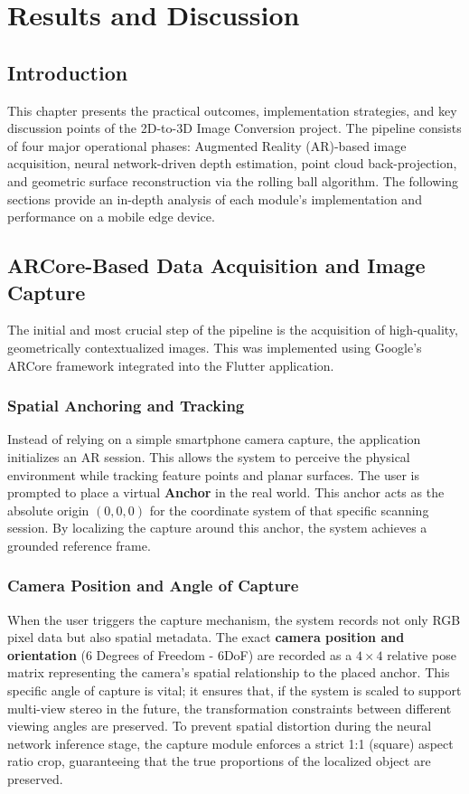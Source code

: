 \chapter{Results and Discussion}

\section{Introduction}
This chapter presents the practical outcomes, implementation strategies, and key discussion points of the 2D-to-3D Image Conversion project. The pipeline consists of four major operational phases: Augmented Reality (AR)-based image acquisition, neural network-driven depth estimation, point cloud back-projection, and geometric surface reconstruction via the rolling ball algorithm. The following sections provide an in-depth analysis of each module's implementation and performance on a mobile edge device.

\section{ARCore-Based Data Acquisition and Image Capture}
The initial and most crucial step of the pipeline is the acquisition of high-quality, geometrically contextualized images. This was implemented using Google's ARCore framework integrated into the Flutter application.

\subsection{Spatial Anchoring and Tracking}
Instead of relying on a simple smartphone camera capture, the application initializes an AR session. This allows the system to perceive the physical environment while tracking feature points and planar surfaces. The user is prompted to place a virtual \textbf{Anchor} in the real world. This anchor acts as the absolute origin $(0,0,0)$ for the coordinate system of that specific scanning session. By localizing the capture around this anchor, the system achieves a grounded reference frame.

\subsection{Camera Position and Angle of Capture}
When the user triggers the capture mechanism, the system records not only RGB pixel data but also spatial metadata. The exact \textbf{camera position and orientation} (6 Degrees of Freedom - 6DoF) are recorded as a $4 \times 4$ relative pose matrix representing the camera's spatial relationship to the placed anchor. This specific angle of capture is vital; it ensures that, if the system is scaled to support multi-view stereo in the future, the transformation constraints between different viewing angles are preserved. To prevent spatial distortion during the neural network inference stage, the capture module enforces a strict 1:1 (square) aspect ratio crop, guaranteeing that the true proportions of the localized object are preserved.

